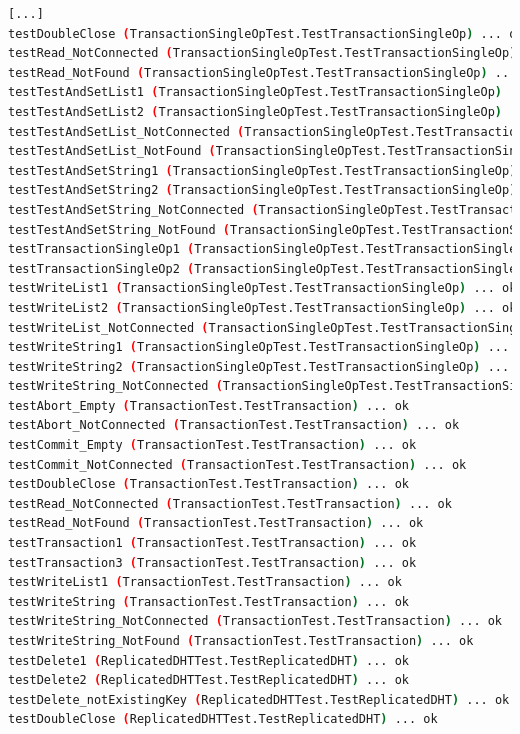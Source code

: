 \documentclass[a4paper]{scrreprt}
\begin{document}
\begin{lstlisting}[language=sh]
%> make python-test
[...]
testDoubleClose (TransactionSingleOpTest.TestTransactionSingleOp) ... ok
testRead_NotConnected (TransactionSingleOpTest.TestTransactionSingleOp) ... ok
testRead_NotFound (TransactionSingleOpTest.TestTransactionSingleOp) ... ok
testTestAndSetList1 (TransactionSingleOpTest.TestTransactionSingleOp) ... ok
testTestAndSetList2 (TransactionSingleOpTest.TestTransactionSingleOp) ... ok
testTestAndSetList_NotConnected (TransactionSingleOpTest.TestTransactionSingleOp) ... ok
testTestAndSetList_NotFound (TransactionSingleOpTest.TestTransactionSingleOp) ... ok
testTestAndSetString1 (TransactionSingleOpTest.TestTransactionSingleOp) ... ok
testTestAndSetString2 (TransactionSingleOpTest.TestTransactionSingleOp) ... ok
testTestAndSetString_NotConnected (TransactionSingleOpTest.TestTransactionSingleOp) ... ok
testTestAndSetString_NotFound (TransactionSingleOpTest.TestTransactionSingleOp) ... ok
testTransactionSingleOp1 (TransactionSingleOpTest.TestTransactionSingleOp) ... ok
testTransactionSingleOp2 (TransactionSingleOpTest.TestTransactionSingleOp) ... ok
testWriteList1 (TransactionSingleOpTest.TestTransactionSingleOp) ... ok
testWriteList2 (TransactionSingleOpTest.TestTransactionSingleOp) ... ok
testWriteList_NotConnected (TransactionSingleOpTest.TestTransactionSingleOp) ... ok
testWriteString1 (TransactionSingleOpTest.TestTransactionSingleOp) ... ok
testWriteString2 (TransactionSingleOpTest.TestTransactionSingleOp) ... ok
testWriteString_NotConnected (TransactionSingleOpTest.TestTransactionSingleOp) ... ok
testAbort_Empty (TransactionTest.TestTransaction) ... ok
testAbort_NotConnected (TransactionTest.TestTransaction) ... ok
testCommit_Empty (TransactionTest.TestTransaction) ... ok
testCommit_NotConnected (TransactionTest.TestTransaction) ... ok
testDoubleClose (TransactionTest.TestTransaction) ... ok
testRead_NotConnected (TransactionTest.TestTransaction) ... ok
testRead_NotFound (TransactionTest.TestTransaction) ... ok
testTransaction1 (TransactionTest.TestTransaction) ... ok
testTransaction3 (TransactionTest.TestTransaction) ... ok
testWriteList1 (TransactionTest.TestTransaction) ... ok
testWriteString (TransactionTest.TestTransaction) ... ok
testWriteString_NotConnected (TransactionTest.TestTransaction) ... ok
testWriteString_NotFound (TransactionTest.TestTransaction) ... ok
testDelete1 (ReplicatedDHTTest.TestReplicatedDHT) ... ok
testDelete2 (ReplicatedDHTTest.TestReplicatedDHT) ... ok
testDelete_notExistingKey (ReplicatedDHTTest.TestReplicatedDHT) ... ok
testDoubleClose (ReplicatedDHTTest.TestReplicatedDHT) ... ok

\end{lstlisting}
\end{document}
